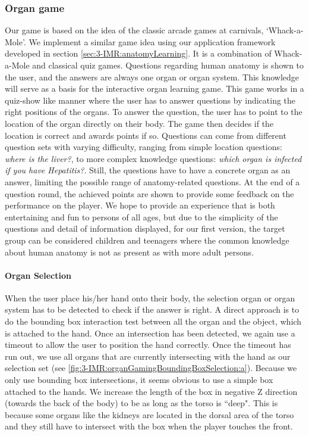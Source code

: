 \subsubsection{Organ game}
Our game is based on the idea of the classic arcade games at carnivals, ‘Whack-a-Mole'. We implement a similar game idea using our application framework developed in section \ref{sec:3-IMR:anatomyLearning}. It is a combination of Whack-a-Mole and classical quiz games. Questions regarding human anatomy is shown to the user, and the answers are always one organ or organ system. This knowledge will serve as a basis for the interactive organ learning game. This game works in a quiz-show like manner where the user has to answer questions by indicating the right positions of the organs.
To answer the question, the user has to point to the location of the organ directly on their body. The game then decides if the location is correct and awards points if so. Questions can come from different question sets with varying difficulty, ranging from simple location questions: \textit{where is the liver?}, to more complex knowledge questions: \textit{which organ is infected if you have Hepatitis?}.
Still, the questions have to have a concrete organ as an answer, limiting the possible range of anatomy-related questions. At the end of a question round, the achieved points are shown to provide some feedback on the performance on the player.
We hope to provide an experience that is both entertaining and fun to persons of all ages, but due to the simplicity of the questions and detail of information displayed, for our first version, the target group can be considered children and teenagers where the common knowledge about human anatomy is not as present as with more adult persons.

\paragraph{Organ Selection}
When the user place his/her hand onto their body, the selection organ or organ system has to be detected to check if the answer is right. 
A direct approach is to do the bounding box interaction test between all the organ and the object, which is attached to the hand. 
Once an intersection has been detected, we again use a timeout to allow the user to position the hand correctly. Once the timeout has run out, we use all organs that are currently intersecting with the hand as our selection set (see \figurename{\ref{fig:3-IMR:organGamingBoundingBoxSelection:a}}).
Because we only use bounding box intersections, it seems obvious to use a simple box attached to the hands. We increase the length of the box in negative Z direction (towards the back of the body) to be as long as the torso is ``deep". This is because some organs like the kidneys are located in the dorsal area of the torso and they still have to intersect with the box when the player touches the front.

